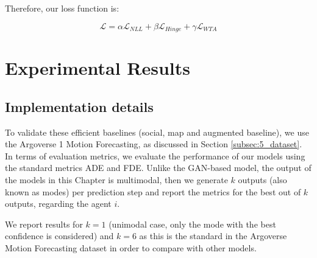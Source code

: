 Therefore, our loss function is:

\begin{equation}
	\mathcal{L} = \alpha \mathcal{L}_{NLL} + \beta \mathcal{L}_{Hinge} + \gamma \mathcal{L}_{WTA}
	\label{eq:loss}
\end{equation}

\section{Experimental Results}
\label{sec:6_experimental_results}

\subsection{Implementation details}
\label{subsec:6_implementation_details}

To validate these efficient baselines (social, map and augmented baseline), we use the Argoverse 1 Motion Forecasting, as discussed in Section \ref{subsec:5_dataset}. In terms of evaluation metrics, we evaluate the performance of our models using the standard metrics \ac{ADE} and \ac{FDE}. Unlike the \ac{GAN}-based model, the output of the models in this Chapter is multimodal, then we generate $k$ outputs (also known as modes) per prediction step and report the metrics for the best out of $k$ outputs, regarding the agent $i$.

We report results for $k=1$ (unimodal case, only the mode with the best confidence is considered) and $k=6$ as this is the standard in the Argoverse Motion Forecasting dataset in order to compare with other models.

